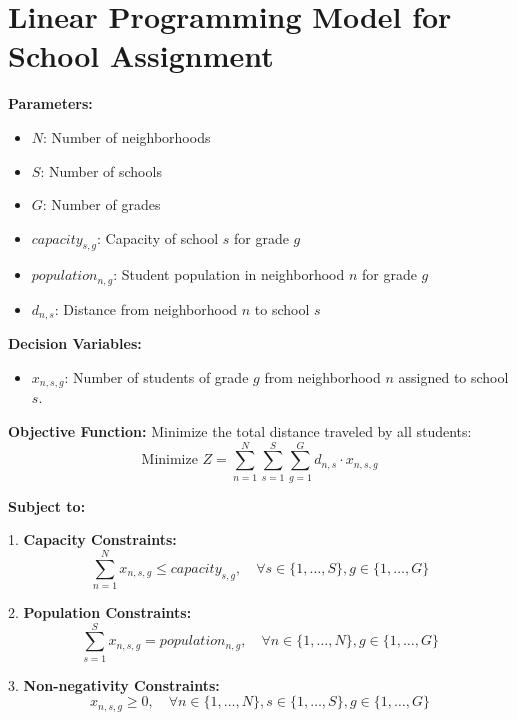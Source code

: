 \documentclass{article}
\begin{document}
\section*{Linear Programming Model for School Assignment}

\textbf{Parameters:}
\begin{itemize}
    \item $N$: Number of neighborhoods
    \item $S$: Number of schools
    \item $G$: Number of grades
    \item $capacity_{s,g}$: Capacity of school $s$ for grade $g$
    \item $population_{n,g}$: Student population in neighborhood $n$ for grade $g$
    \item $d_{n,s}$: Distance from neighborhood $n$ to school $s$
\end{itemize}

\textbf{Decision Variables:}
\begin{itemize}
    \item $x_{n,s,g}$: Number of students of grade $g$ from neighborhood $n$ assigned to school $s$.
\end{itemize}

\textbf{Objective Function:}
Minimize the total distance traveled by all students:
\[
\text{Minimize } Z = \sum_{n=1}^{N} \sum_{s=1}^{S} \sum_{g=1}^{G} d_{n,s} \cdot x_{n,s,g}
\]

\textbf{Subject to:}

1. \textbf{Capacity Constraints:}
\[
\sum_{n=1}^{N} x_{n,s,g} \leq capacity_{s,g}, \quad \forall s \in \{1, \ldots, S\}, g \in \{1, \ldots, G\}
\]

2. \textbf{Population Constraints:}
\[
\sum_{s=1}^{S} x_{n,s,g} = population_{n,g}, \quad \forall n \in \{1, \ldots, N\}, g \in \{1, \ldots, G\}
\]

3. \textbf{Non-negativity Constraints:}
\[
x_{n,s,g} \geq 0, \quad \forall n \in \{1, \ldots, N\}, s \in \{1, \ldots, S\}, g \in \{1, \ldots, G\}
\]
\end{document}
